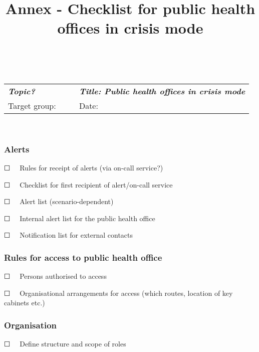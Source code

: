 \documentclass{article}
\begin{document}
\title{Annex - Checklist for public health offices in crisis mode}

\maketitle


 


\begin{tabu} to \textwidth { |X|X|X| }
\hline



\emph{\textbf{Topic?}}        &  & \emph{\textbf{Title: Public health offices in crisis mode}}
 \\


Target group:  &  & Date:
 \\
\hline

\end{tabu}

                    


\subsubsection{Alerts}\label{H1727143}



☐   Rules for receipt of alerts (via on-call service?)


☐   Checklist for first recipient of alert/on-call service


☐   Alert list (scenario-dependent)


☐   Internal alert list for the public health office


☐   Notification list for external contacts 


\subsubsection{Rules for access to public health office}\label{H368347}



☐   Persons authorised to access


☐   Organisational arrangements for access (which routes, location of key cabinets etc.)


\subsubsection{Organisation}\label{H6256762}



☐   Define structure and scope of roles
\end{document}
